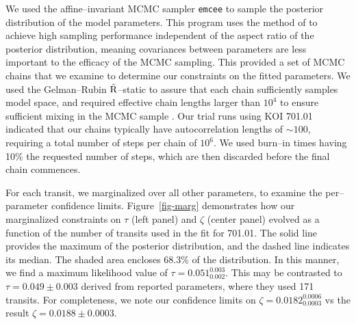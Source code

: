 We used the affine--invariant MCMC sampler {\tt emcee}
\citep{2013PASP..125..306F} to sample the posterior distribution of
the model parameters.  This program uses the method of
\cite{Goodman-Weare} to achieve high sampling performance independent
of the aspect ratio of the posterior distribution, meaning covariances
between parameters are less important to the efficacy of the MCMC
sampling.  This provided a set of MCMC chains that we examine to
determine our constraints on the fitted parameters.  We used the
Gelman--Rubin $\hat{\rm R}$--static \citep{Gelman92} to assure that
each chain sufficiently samples model space, and required effective
chain lengths larger than $10^4$ to ensure sufficient mixing in the
MCMC sample \cite[e.g.][]{2004PhRvD..69j3501T}.  Our trial runs using
KOI 701.01 indicated that our chains typically have autocorrelation
lengths of $\sim 100$, requiring a total number of steps per chain of
$10^6$.  We used burn--in times having 10\% the requested number of
steps, which are then discarded before the final chain commences.

%
%
For each transit, we marginalized over all other parameters, to
examine the per--parameter confidence limits.  Figure~\ref{fig-marg}
demonstrates how our marginalized constraints on $\tau$ (left panel)
and $\zeta$ (center panel) evolved as a function of the number of
transits used in the fit for 701.01.  The solid line provides the
maximum of the posterior distribution, and the dashed line indicates
its median.  The shaded area encloses 68.3\% of the distribution.  In
this manner, we find a maximum likelihood value of $\tau =
0.051_{0.002}^{0.003}$.  This may be contrasted to $\tau = 0.049 \pm
0.003 $ derived from reported \cite{2013arXiv1304.7387B} parameters,
where they used 171 transits.  For completeness, we note our
confidence limits on $\zeta = 0.0182_{0.0003}^{0.0006}$ vs
the \cite{2013arXiv1304.7387B} result $\zeta = 0.0188 \pm 0.0003$.


